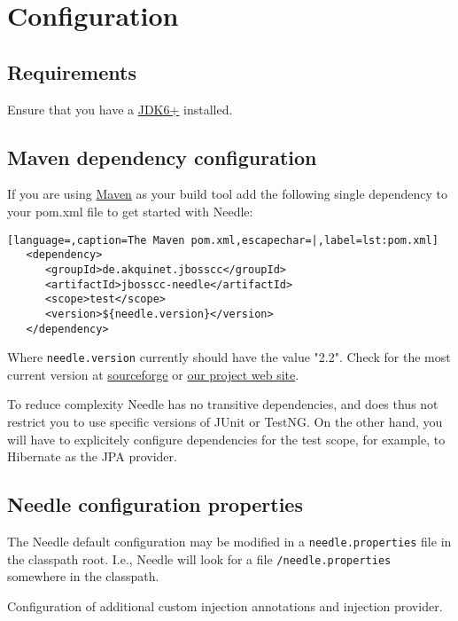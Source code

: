 \chapter{Configuration}

\section{Requirements}

Ensure that you have a 
\href{http://www.oracle.com/technetwork/java/javase/downloads/index.html}{JDK6+} installed.

\section{Maven dependency configuration}
If you are using \href{http://maven.apache.org/}{Maven} as your build tool add the following single dependency to your pom.xml file to get started with Needle:

\begin{lstlisting}[language=,caption=The Maven pom.xml,escapechar=|,label=lst:pom.xml]
   <dependency>
      <groupId>de.akquinet.jbosscc</groupId>
      <artifactId>jbosscc-needle</artifactId>
      <scope>test</scope>
      <version>${needle.version}</version>
   </dependency>
\end{lstlisting}

Where \verb|needle.version| currently should have the value "2.2". Check for the most current version at \href{http://sourceforge.net/projects/jbosscc-needle/}{sourceforge} or \href{http://needle.spree.de/}{our project web site}.

To reduce complexity Needle has no transitive dependencies, and does thus not restrict you to use specific versions of JUnit or TestNG.
On the other hand, you will have to explicitely configure dependencies for the test scope, for example, to Hibernate as the JPA provider.

\section{Needle configuration properties}

The Needle default configuration may be modified in a \verb|needle.properties| file in the classpath root. I.e., Needle will look for a file 
\verb|/needle.properties| somewhere in the classpath.

\parskip 14pt
\parindent 0pt
Configuration of additional custom injection annotations and injection provider.


